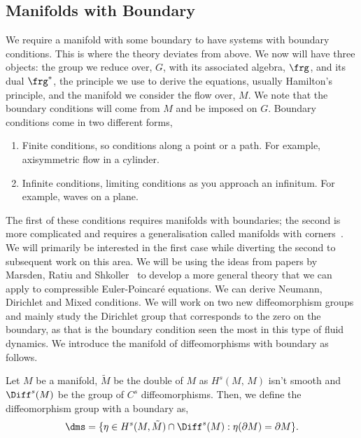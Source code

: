 \subsection{Manifolds with Boundary}
\label{ss:man_w_b}
We require a manifold with some boundary to have systems with boundary conditions. This is where the theory deviates from above. We now will have three objects: the group we reduce over, $G$, with its associated algebra, $\frg$, and its dual $\frg^*$, the principle we use to derive the equations, usually Hamilton's principle, and the manifold we consider the flow over, $M$. We note that the boundary conditions will come from $M$ and be imposed on $G$. Boundary conditions come in two different forms,
\begin{enumerate}
  \item Finite conditions, so conditions along a point or a path. For example, axisymmetric flow in a cylinder.
  \item Infinite conditions, limiting conditions as you approach an infinitum. For example, waves on a plane.
\end{enumerate}
\noindent
The first of these conditions requires manifolds with boundaries; the second is more complicated and requires a generalisation called manifolds with corners~\cite{joyce2010manifolds}. We will primarily be interested in the first case while diverting the second to subsequent work on this area. We will be using the ideas from papers by Marsden, Ratiu and Shkoller~\cite{marsden1999geometry,shkoller2000incompressible} to develop a more general theory that we can apply to compressible Euler-Poincar\'e equations. We can derive Neumann, Dirichlet and Mixed conditions. We will work on two new diffeomorphism groups and mainly study the Dirichlet group that corresponds to the zero on the boundary, as that is the boundary condition seen the most in this type of fluid dynamics. We introduce the manifold of diffeomorphisms with boundary as follows.
\begin{ndefi}
  Let $M$ be a manifold, $\tilde M$ be the double of $M$ as $H^s(M,\, M)$ isn't smooth and $\Diff^s(M)$ be the group of $C^s$ diffeomorphisms. Then, we define the diffeomorphism group with a boundary as,
  $$ \dms = \{\eta \in H^s(M, \tilde M) \cap \Diff^s(M) : \eta (\partial M) = \partial M \}. $$
\end{ndefi}

